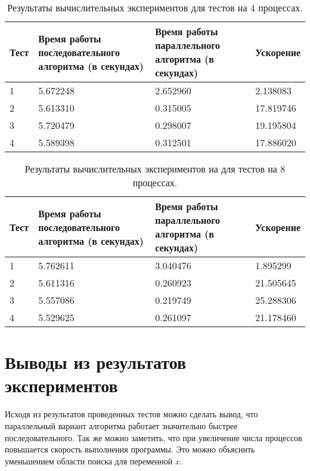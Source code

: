 \documentclass{report}
\begin{document}
\begin{table}[!h]
\caption{Результаты вычислительных экспериментов для тестов на 4 процессах.}
\centering
\begin{tabular}{| p{2cm} | p{3cm} | p{4cm} | p{2cm} |}
\hline
Тест & Время работы последовательного алгоритма (в секундах) & Время работы параллельного алгоритма (в секундах) & Ускорение  \\[5pt]
\hline
1        & 5.672248       & 2.652960      & 2.138083       \\
2        & 5.613310       & 0.315005      & 17.819746       \\
3        & 5.720479       & 0.298007      & 19.195804       \\
4        & 5.589398       & 0.312501      & 17.886020       \\

\hline
\end{tabular}
\end{table}

\begin{table}[!h]
\caption{Результаты вычислительных экспериментов на для тестов на 8 процессах. }
\centering
\begin{tabular}{| p{2cm} | p{3cm} | p{4cm} | p{2cm} |}
\hline
Тест & Время работы последовательного алгоритма (в секундах) & Время работы параллельного алгоритма (в секундах) & Ускорение  \\[5pt]
\hline
1        & 5.762611       & 3.040476      & 1.895299       \\
2        & 5.611316       & 0.260923      & 21.505645       \\
3        & 5.557086       & 0.219749      & 25.288306       \\
4        & 5.529625       & 0.261097      & 21.178460       \\
\hline
\end{tabular}
\end{table}

\clearpage

\section*{Выводы из результатов экспериментов }
Исходя из результатов проведенных тестов можно сделать вывод, что параллельный вариант алгоритма работает значительно быстрее последовательного. Так же можно заметить, что при увеличение числа процессов повышается скорость выполнения программы. Это можно обьяснить уменьшением области поиска для переменной $x$.
\end{document}
